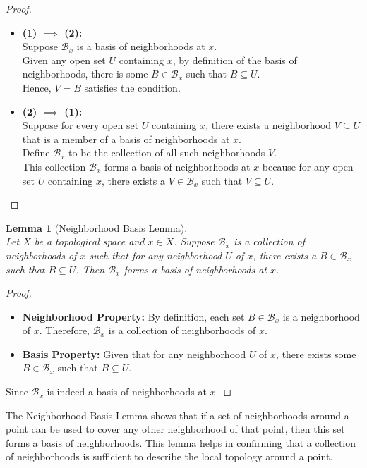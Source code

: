 \documentclass[12pt, reqno]{amsart}
\newtheorem{lemma}[theorem]{Lemma}
\theoremstyle{definition}
\numberwithin{equation}{section}
\begin{document}
\begin{proof} \hfill
\begin{itemize}
  \item \textbf{(1) $\implies$ (2):} \\
  Suppose $\mathcal{B}_x$ is a basis of neighborhoods at $x$.\\
  Given any open set $U$ containing $x$, by definition of the basis of neighborhoods, there is some $B \in \mathcal{B}_x$ such that $B \subseteq U$.\\
  Hence, $V = B$ satisfies the condition.
  
  \item \textbf{(2) $\implies$ (1):} \\
  Suppose for every open set $U$ containing $x$, there exists a neighborhood $V \subseteq U$ that is a member of a basis of neighborhoods at $x$. \\
  Define $\mathcal{B}_x$ to be the collection of all such neighborhoods $V$.\\
  This collection $\mathcal{B}_x$ forms a basis of neighborhoods at $x$ because for any open set $U$ containing $x$, there exists a $V \in \mathcal{B}_x$ such that $V \subseteq U$.
\end{itemize}
\end{proof}

\begin{lemma} [Neighborhood Basis Lemma] \hfill \\
Let $X$ be a topological space and $x \in X$. Suppose $\mathcal{B}_x$ is a collection of neighborhoods of $x$ such that for any neighborhood $U$ of $x$, there exists a $B \in \mathcal{B}_x$ such that $B \subseteq U$. Then $\mathcal{B}_x$ forms a basis of neighborhoods at $x$.
\end{lemma}

\begin{proof} \hfill
    \begin{itemize}
  \item \textbf{Neighborhood Property:} By definition, each set $B \in \mathcal{B}_x$ is a neighborhood of $x$. Therefore, $\mathcal{B}_x$ is a collection of neighborhoods of $x$.

  \item \textbf{Basis Property:} Given that for any neighborhood $U$ of $x$, there exists some $B \in \mathcal{B}_x$ such that $B \subseteq U$.
\end{itemize}

Since $\mathcal{B}_x$ is indeed a basis of neighborhoods at $x$.
\end{proof}
The Neighborhood Basis Lemma shows that if a set of neighborhoods around a point can be used to cover any other neighborhood of that point, then this set forms a basis of neighborhoods. This lemma helps in confirming that a collection of neighborhoods is sufficient to describe the local topology around a point.\\
\end{document}
